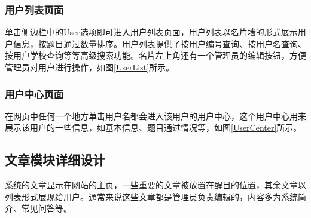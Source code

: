 \subsubsection{用户列表页面}
单击侧边栏中的User选项即可进入用户列表页面，用户列表以名片墙的形式展示用户信息，按题目通过数量排序。用户列表提供了按用户编号查询、按用户名查询、按用户学校查询等等高级搜索功能。名片左上角还有一个管理员的编辑按钮，方便管理员对用户进行操作，如图\ref{UserList}所示。

\subsubsection{用户中心页面}
在网页中任何一个地方单击用户名都会进入该用户的用户中心，这个用户中心用来展示该用户的一些信息，如基本信息、题目通过情况等，如图\ref{UserCenter}所示。


%






\subsection{文章模块详细设计}
系统的文章显示在网站的主页，一些重要的文章被放置在醒目的位置，其余文章以列表形式展现给用户。通常来说这些文章都是管理员负责编辑的，内容多为系统简介、常见问答等。

